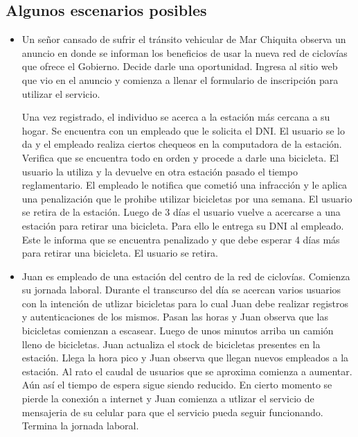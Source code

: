 \subsection{Algunos escenarios posibles}
\begin{itemize}

\item Un señor cansado de sufrir el tránsito vehicular de Mar Chiquita observa un anuncio en donde se informan los beneficios de usar la nueva red de ciclovías que ofrece el Gobierno. Decide darle una oportunidad. Ingresa al sitio web que vio en el anuncio y comienza a llenar el formulario de inscripción para utilizar el servicio. 

Una vez registrado, el individuo se acerca a la estación más cercana a su hogar. Se encuentra con un empleado que le solicita el DNI. El usuario se lo da y el empleado realiza ciertos chequeos en la computadora de la estación. Verifica que se encuentra todo en orden y procede a darle una bicicleta. El usuario la utiliza y la devuelve en otra estación pasado el tiempo reglamentario. El empleado le notifica que cometió una infracción y le aplica una penalización que le prohibe utilizar bicicletas por una semana. El usuario se retira de la estación. Luego de 3 días el usuario vuelve a acercarse a una estación para retirar una bicicleta. Para ello le entrega su DNI al empleado. Este le informa que se encuentra penalizado y que debe esperar 4 días más para retirar una bicicleta. El usuario se retira.

\item Juan es empleado de una estación del centro de la red de ciclovías. Comienza su jornada laboral. Durante el transcurso del día se acercan varios usuarios con la intención de utlizar bicicletas para lo cual Juan debe realizar registros y autenticaciones de los mismos. Pasan las horas y Juan observa que las bicicletas comienzan a escasear. Luego de unos minutos arriba un camión lleno de bicicletas. Juan actualiza el stock de bicicletas presentes en la estación.
Llega la hora pico y Juan observa que llegan nuevos empleados a la estación. Al rato el caudal de usuarios que se aproxima comienza a aumentar. Aún así el tiempo de espera sigue siendo reducido. En cierto momento se pierde la conexión a internet y Juan comienza a utlizar el servicio de mensajeria de su celular para que el servicio pueda seguir funcionando. Termina la jornada laboral.

\end{itemize}
